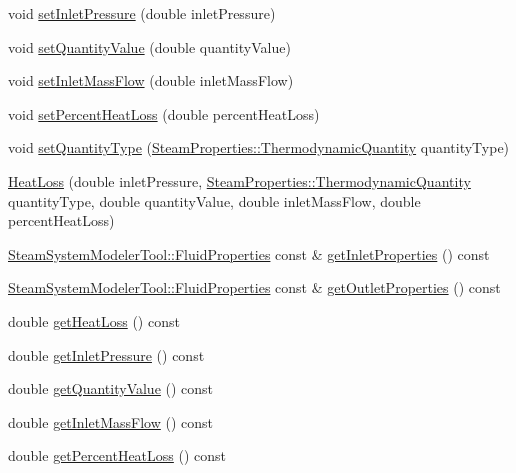 \begin{DoxyCompactItemize}
\item 
void \hyperlink{class_heat_loss_ab0a6b1f2a964d161d25758318f25f7e3}{set\+Inlet\+Pressure} (double inlet\+Pressure)
\item 
void \hyperlink{class_heat_loss_ae6b6c4ac28471d7bc94e3886c48a90bd}{set\+Quantity\+Value} (double quantity\+Value)
\item 
void \hyperlink{class_heat_loss_ac4154dc9922b6ddf3f2e7a10cc64c61f}{set\+Inlet\+Mass\+Flow} (double inlet\+Mass\+Flow)
\item 
void \hyperlink{class_heat_loss_a2a4a80b16c1f975e194ae466b20d46bd}{set\+Percent\+Heat\+Loss} (double percent\+Heat\+Loss)
\item 
void \hyperlink{class_heat_loss_a7c125f1137f31eba8826a1aa3b905290}{set\+Quantity\+Type} (\hyperlink{class_steam_properties_ae0294bedf7d178c2d8fb6aed0f62fbff}{Steam\+Properties\+::\+Thermodynamic\+Quantity} quantity\+Type)
\item 
\hyperlink{class_heat_loss_a1c1bba4ef783d97e2ed63f39f625e82f}{Heat\+Loss} (double inlet\+Pressure, \hyperlink{class_steam_properties_ae0294bedf7d178c2d8fb6aed0f62fbff}{Steam\+Properties\+::\+Thermodynamic\+Quantity} quantity\+Type, double quantity\+Value, double inlet\+Mass\+Flow, double percent\+Heat\+Loss)
\item 
\hyperlink{struct_steam_system_modeler_tool_1_1_fluid_properties}{Steam\+System\+Modeler\+Tool\+::\+Fluid\+Properties} const  \& \hyperlink{class_heat_loss_a7bea461460dbacf1855d5375bbf6c097}{get\+Inlet\+Properties} () const
\item 
\hyperlink{struct_steam_system_modeler_tool_1_1_fluid_properties}{Steam\+System\+Modeler\+Tool\+::\+Fluid\+Properties} const  \& \hyperlink{class_heat_loss_a3e483dda6f393d67d7a0f28bcd75e545}{get\+Outlet\+Properties} () const
\item 
double \hyperlink{class_heat_loss_acc39533782f4f5cbf902d36f7bfc53b0}{get\+Heat\+Loss} () const
\item 
double \hyperlink{class_heat_loss_a09e6e05477fd6794ea7f42bb43da2f50}{get\+Inlet\+Pressure} () const
\item 
double \hyperlink{class_heat_loss_a7f7fd85e4fc8bf96dcc213f3dd44ecf7}{get\+Quantity\+Value} () const
\item 
double \hyperlink{class_heat_loss_ad11a428f99a4945628f66adecb88bf5a}{get\+Inlet\+Mass\+Flow} () const
\item 
double \hyperlink{class_heat_loss_acbbf01db5cde157057e4d766cab22382}{get\+Percent\+Heat\+Loss} () const
\item 

\end{DoxyCompactItemize}
